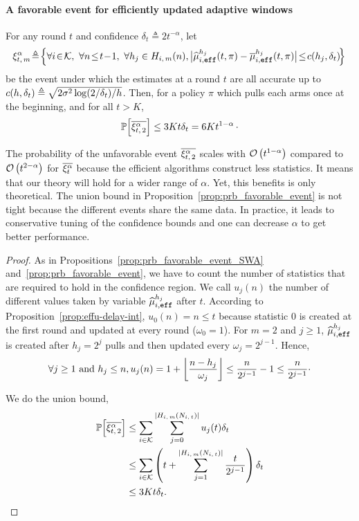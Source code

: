 \paragraph{A favorable event for efficiently updated adaptive windows}
\begin{proposition}
\label{prop:prb_favorable_event_eff}
For any round $t$ and confidence $\delta_{t} \triangleq 2t^{-\alpha}$, let 
%
\begin{equation*}
\!\HPeff\! \triangleq\! \Big\{ \forall i\!\in\!\arms,\ \forall n \!\leq\! t\!-\!1 ,\ \forall h_j \in \Him(n), \big| \hmueff(t, \pi) - \bmueff(t,\pi) \big| \!\leq\! c(h_j, \delta_{t}) \!\Big\}
\end{equation*}
 be the event under which the estimates at a round $t$  are all accurate up to $c(h,\delta_{t}) \triangleq \sqrt{2 \sigma^2\log(2/\delta_t)/h}$. Then, for a policy $\pi$ which pulls each arms once at the beginning, and for all $t>K$,
\[
\mathbb{P}\Big[\overline{\xi^\alpha_{t,\, 2}}\Big] \leq 3Kt\delta_t= 6Kt^{1-\alpha}\,\cdot
\]
\end{proposition} 
\begin{remark}
The probability of the unfavorable event $\overline{\xi^\alpha_{t,\, 2}}$ scales with $\mathcal{O}\left(t^{1-\alpha}\right)$ compared to $\mathcal{O}\left(t^{2-\alpha}\right)$ for $\overline{\xi^\alpha_t}$ because the efficient algorithms construct less statistics. It means that our theory will hold for a wider range of $\alpha$. Yet, this benefits is only theoretical. The union bound in Proposition~\ref{prop:prb_favorable_event} is not tight because the different events share the same data. In practice, it leads to conservative tuning of the confidence bounds and one can decrease $\alpha$ to get better performance. 
\end{remark}

\begin{proof}
As in Propositions~\ref{prop:prb_favorable_event_SWA} and~\ref{prop:prb_favorable_event}, we have to count the number of statistics that are required to hold in the confidence region. 
We call  $u_j(n)$ the number of different values taken by variable $\widehat{\mu}_{i,\texttt{\footnotesize{eff}}}^{h_j}$ after $t$. According to Proposition~\ref{prop:effu-delay-int}, $u_0(n) = n \leq t $ because statistic $0$ is created at the first round and updated at every round ($\omega_0=1$). For $m=2$ and $j\geq 1$,  $\widehat{\mu}_{i,\texttt{\footnotesize{eff}}}^{h_j}$ is created after $h_j= 2^j$ pulls and then updated every $\omega_j = 2^{j-1}$. Hence, 
\[
\forall j \geq 1 \text{ and } h_j \leq n, u_j(n) = 1 + \left\lfloor\frac{n-h_j}{\omega_j}\right\rfloor \leq \frac{n}{2^{j-1}} - 1 \leq \frac{n}{2^{j-1}}\cdot
\]

We do the union bound, 
\begin{align*}
    \mathbb{P}\Big[\overline{\xi^\alpha_{t,\, 2}}\Big] &\leq \sum_{i \in \mathcal{K}} \sum_{j=0}^{|H_{i,\,m}(N_{i,\,t})|} u_j(t) \delta_t \\
    &\leq \sum_{i \in \mathcal{K}} \left(t  + \sum_{j=1}^{|H_{i,\,m}(N_{i,\,t})|} \frac{t}{2^{j-1}}\right) \delta_t \\
    &\leq 3Kt\delta_t.
\end{align*}
\end{proof}

